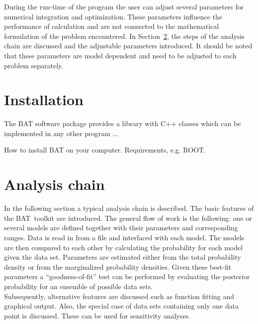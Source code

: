 \documentclass[11pt, a4paper]{article}
\newcommand{\BAT}{{\sc BAT}}
\begin{document}
\noindent 
During the run-time of the program the user can adjust several
parameters for numerical integration and optimization. These
parameters influence the performance of calculation and are not
connected to the mathematical formulation of the problem
encountered. In Section~\ref{section:analysis}, the steps of the
analysis chain are discussed and the adjustable parameters
introduced. It should be noted that these parameters are model
dependent and need to be adjusted to each problem separately. 


\section{Installation} 

The BAT software package provides a library with C++ classes which can
be implemented in any other program ...

How to install BAT on your computer. Requirements, e.g. ROOT.


\section{Analysis chain}
\label{section:analysis}

In the following section a typical analysis chain is described. The basic features 
of the \BAT\ toolkit are introduced. The general flow of work is the
following: one or several models are defined together with their
parameters and corresponding ranges. Data is read in from a file and
interfaced with each model. The models are then compared to each other by
calculating the probability for each model given the data
set. Parameters are estimated either from the total probability density
or from the marginalized probability densities. Given these best-fit
parameters a ``goodness-of-fit'' test can be performed by evaluating the
posterior probability for an ensemble of possible data sets. \\ 

\noindent 
Subsequently, alternative features are discussed such as function fitting and 
graphical output. Also, the special case of data sets containing only one data point 
is discussed. These can be used for sensitivity analyses. 
\end{document}
